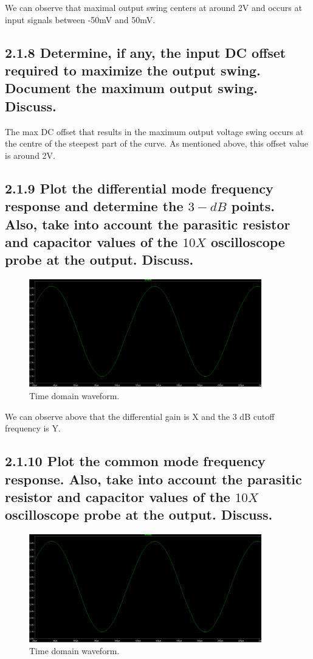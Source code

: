 \documentclass[12pt]{article}
\begin{document}
We can observe that maximal output swing centers at around 2V and occurs at input signals between -50mV and 50mV.

\subsection*{2.1.8 Determine, if any, the input DC offset required to maximize the output swing. Document the maximum output swing. Discuss.}

The max DC offset that results in the maximum output voltage swing occurs at the centre of the steepest part of the curve. As mentioned above, this offset value is around 2V.

\subsection*{2.1.9 Plot the differential mode frequency response and determine the $3-dB$ points. Also, take into account the parasitic resistor and capacitor values of the $10X$ oscilloscope probe at the output. Discuss.  }

\begin{figure}[H]
\centering
\includegraphics[width=0.9\textwidth]{Screenshots/Graph_217_time.png}
\caption{\label{fig:time-domain} Time domain waveform.}
\end{figure}

We can observe above that the differential gain is X and the 3 dB cutoff frequency is Y.

\subsection*{2.1.10 Plot the common mode frequency response. Also, take into account the parasitic resistor and capacitor values of the $10X$ oscilloscope probe at the output. Discuss. }

\begin{figure}[H]
\centering
\includegraphics[width=0.9\textwidth]{Screenshots/Graph_217_time.png}
\caption{\label{fig:time-domain} Time domain waveform.}
\end{figure}
\end{document}
